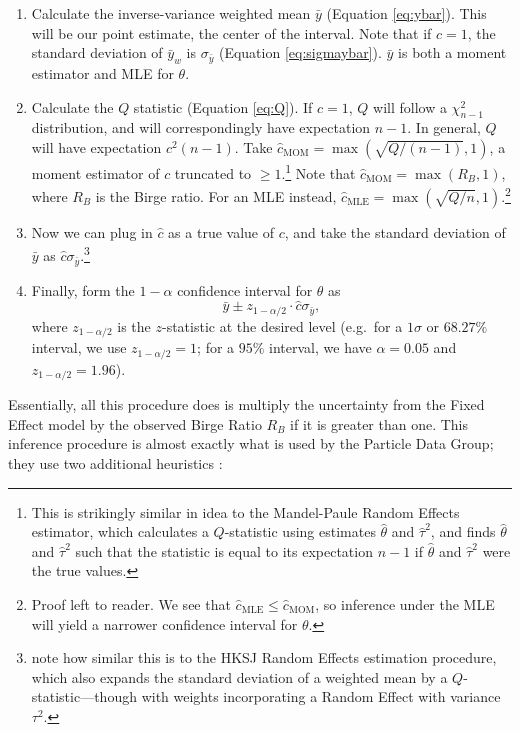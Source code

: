 \documentclass[letterpaper,12pt]{article}
\begin{document}
\begin{enumerate}
\item
  Calculate the inverse-variance weighted mean $\bar{y}$ (Equation \ref{eq:ybar}). This will be our point estimate, the center of the interval. Note that if $c=1$, the standard deviation of $\bar{y}_w$ is $\sigma_{\bar y}$ (Equation \ref{eq:sigmaybar}). $\bar{y}$ is both a moment estimator and MLE for $\theta$.
\item
  Calculate the $Q$ statistic (Equation \ref{eq:Q}). If $c=1$, $Q$ will follow a $\chi^2_{n-1}$ distribution, and will correspondingly have expectation $n-1$. In general, $Q$ will have expectation $c^2(n-1)$. Take $\hat{c}_{\mathrm{MOM}}=\max(\sqrt{Q/(n-1)},1)$, a moment estimator of $c$ truncated to $\geq 1$.\footnote{This is strikingly similar in idea to the Mandel-Paule Random Effects estimator, which calculates a $Q$-statistic using estimates $\hat\theta$ and $\hat\tau^2$, and finds $\hat\theta$ and $\hat\tau^2$ such that the statistic is equal to its expectation $n-1$ if $\hat\theta$ and $\hat\tau^2$ were the true values.} Note that $\hat{c}_{\mathrm{MOM}}=\max(R_B,1)$, where $R_B$ is the Birge ratio. For an MLE instead, $\hat{c}_{\mathrm{MLE}}=\max(\sqrt{Q/n},1)$.\footnote{Proof left to reader. We see that $\hat{c}_\mathrm{MLE}\leq \hat{c}_{\mathrm{MOM}}$, so inference under the MLE will yield a narrower confidence interval for $\theta$.}
\item
  Now we can plug in $\hat c$ as a true value of $c$, and take the standard deviation of $\bar{y}$ as $\hat c\sigma_{\bar y}$.\footnote{\citet{jackson2013meta} note how similar this is to the HKSJ Random Effects estimation procedure, which also expands the standard deviation of a weighted mean by a $Q$-statistic---though with weights incorporating a Random Effect with variance $\tau^2$.}
\item
  Finally, form the $1-\alpha$ confidence interval for $\theta$ as \[\bar{y}\pm z_{1-{\alpha/2}}\cdot \hat c\sigma_{\bar y},\] where $z_{1-\alpha/2}$ is the $z$-statistic at the desired level (e.g.~for a $1\sigma$ or $68.27\%$ interval, we use $z_{1-\alpha/2}=1$; for a $95\%$ interval, we have $\alpha=0.05$ and $z_{1-\alpha/2}=1.96$).
\end{enumerate}

Essentially, all this procedure does is multiply the uncertainty from the Fixed Effect model by the observed Birge Ratio $R_B$ if it is greater than one. This inference procedure is almost exactly what is used by the Particle Data Group; they use two additional heuristics \citep[Section 5.2.2]{navas2024review}:
\end{document}
